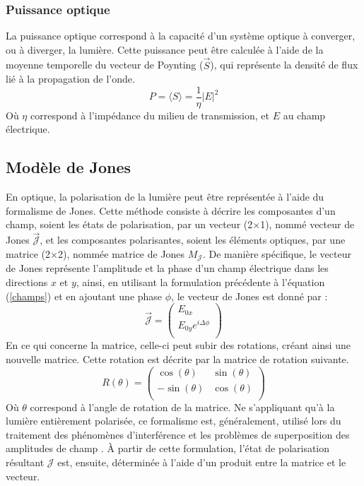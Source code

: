 \documentclass[11pt,letterpaper]{article}
\begin{document}
\subsubsection{Puissance optique}
La puissance optique correspond à la capacité d'un système optique à converger, ou à diverger, la lumière. Cette puissance peut être calculée à l'aide de la moyenne temporelle du vecteur de Poynting ($\vec{S}$), qui représente la densité de flux lié à la propagation de l'onde.
\begin{equation}\label{power}
  P=\langle S\rangle=\frac{1}{\eta}|E|^{2}
\end{equation}
Où $\eta$ correspond à l'impédance du milieu de transmission, et $E$ au champ électrique.

\subsection{Modèle de Jones}
En optique, la polarisation de la lumière peut être représentée à l'aide du formalisme de Jones. Cette méthode consiste à décrire les composantes d'un champ, soient les états de polarisation, par un vecteur (2$\times$1), nommé vecteur de Jones $\vec{\mathcal{J}}$, et les composantes polarisantes, soient les éléments optiques, par une matrice (2$\times$2), nommée matrice de Jones $M_{\mathcal{J}}$. De manière spécifique, le vecteur de Jones représente l'amplitude et la phase d'un champ électrique dans les directions $x$ et $y$, ainsi, en utilisant la formulation précédente à l'équation (\ref{champs}) et en ajoutant une phase $\phi$, le vecteur de Jones est donné par :
\begin{equation}
  \vec{\mathcal{J}}=
  \begin{pmatrix}
    E_{0x} \\
    E_{0y}e^{i\Delta\phi} \\
  \end{pmatrix}
\end{equation}
En ce qui concerne la matrice, celle-ci peut subir des rotations, créant ainsi une nouvelle matrice. Cette rotation est décrite par la matrice de rotation suivante.
\begin{equation}\label{rotat}
  R(\theta)=
  \begin{pmatrix}
    \cos(\theta) & \sin(\theta) \\
    -\sin(\theta) & \cos(\theta) \\
  \end{pmatrix}
\end{equation}
Où $\theta$ correspond à l'angle de rotation de la matrice. Ne s'appliquant qu'à la lumière entièrement polarisée, ce formalisme est, généralement, utilisé lors du traitement des phénomènes d'interférence et les problèmes de superposition des amplitudes de champ \cite{collett_jones_2005}. À partir de cette formulation, l'état de polarisation résultant $\mathcal{J}$ est, ensuite, déterminée à l'aide d'un produit entre la matrice et le vecteur.
\end{document}
